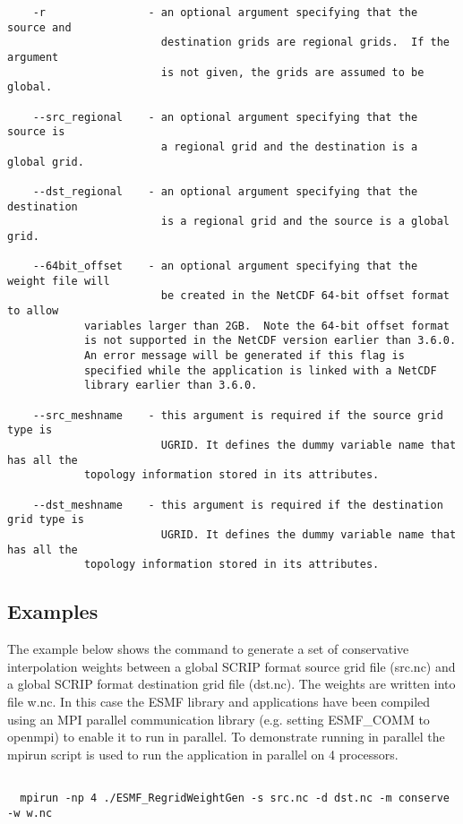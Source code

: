 \begin{verbatim}
    -r                - an optional argument specifying that the source and 
                        destination grids are regional grids.  If the argument
                        is not given, the grids are assumed to be global.

    --src_regional    - an optional argument specifying that the source is 
                        a regional grid and the destination is a global grid.  

    --dst_regional    - an optional argument specifying that the destination 
                        is a regional grid and the source is a global grid.  

    --64bit_offset    - an optional argument specifying that the weight file will
                        be created in the NetCDF 64-bit offset format to allow
			variables larger than 2GB.  Note the 64-bit offset format
			is not supported in the NetCDF version earlier than 3.6.0.
			An error message will be generated if this flag is
			specified while the application is linked with a NetCDF 
			library earlier	than 3.6.0.

    --src_meshname    - this argument is required if the source grid type is
                        UGRID. It defines the dummy variable name that has all the
			topology information stored in its attributes.

    --dst_meshname    - this argument is required if the destination grid type is
                        UGRID. It defines the dummy variable name that has all the
			topology information stored in its attributes.

\end{verbatim}


\subsection{Examples}

The example below shows the command to generate a set of conservative interpolation weights between a global 
SCRIP format source grid file (src.nc) and a global SCRIP format destination grid file (dst.nc). The weights
are written into file w.nc. In this case the
ESMF library and applications have been compiled using an MPI parallel communication library 
(e.g. setting ESMF\_COMM to openmpi) to enable it to run in parallel. To demonstrate running in parallel
the mpirun script is used to run the application in parallel on 4 processors. 

\begin{verbatim}

  mpirun -np 4 ./ESMF_RegridWeightGen -s src.nc -d dst.nc -m conserve -w w.nc

\end{verbatim}

